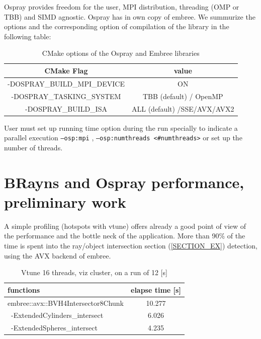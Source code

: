\documentclass[11pt]{amsart}
\begin{document}
Ospray provides freedom for the user, MPI distribution, threading  (OMP or TBB) and SIMD agnostic. Ospray has in own copy of embree. We summurize the options and the corresponding option
of compilation of the library in the following table:

\begin{table}[h]
\caption{CMake options of the Ospray  and Embree libraries}
\begin{center}
\begin{tabular}{c c}
CMake Flag                                                                   & value \\
\hline
 -DOSPRAY\_BUILD\_MPI\_DEVICE          &  ON \\
 -DOSPRAY\_TASKING\_SYSTEM  & TBB (default) /  OpenMP    \\
 -DOSPRAY\_BUILD\_ISA                   & ALL (default) /SSE/AVX/AVX2 \\
\hline
\end{tabular}
\end{center}
\label{default}
\end{table}%

User must set up running time option during the run specially to indicate a parallel execution {\tt--osp:mpi} , {\tt--osp:numthreads <\#numthreads>}  or set up the number of threads.

\section{BRayns and Ospray performance, preliminary work}

A simple profiling (hotspots with vtune) offers already a good point of view of the performance and the bottle neck of the application.  More than 90\% of the time is spent into
the ray/object intersection section (\ref{SECTION_EX}) detection, using the AVX backend of embree.

\begin{table}[h]
\caption{Vtune 16 threads, viz cluster, on a run of 12 [s] \label{PROF}}
\begin{center}
\begin{tabular}{l c }
functions &  elapse time [s] \\
\hline
embree::avx::BVH4Intersector8Chunk & 10.277 \\
\,\,\,-ExtendedCylinders\_intersect   &  6.026  \\
\,\,\,-ExtendedSpheres\_intersect & 4.235 \\
\hline
\end{tabular}
\end{center}
\label{default}
\end{table}%
\end{document}
